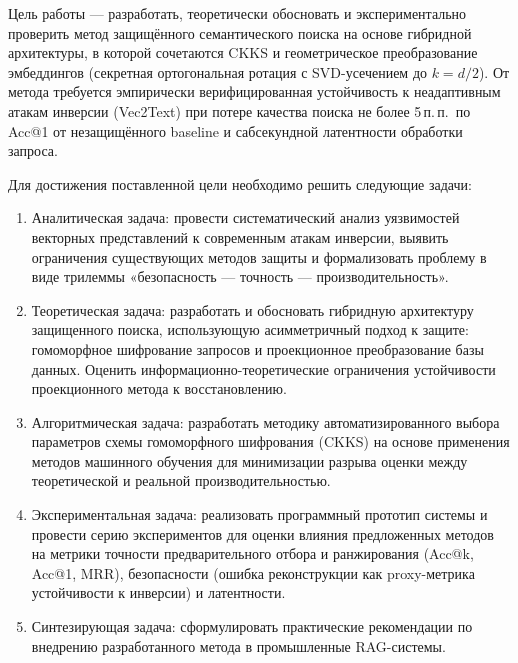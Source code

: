 \documentclass[a4paper, 12pt, oneside, openany]{article}
\begin{document}
Цель работы --- разработать, теоретически обосновать и экспериментально проверить метод защищённого семантического поиска на основе гибридной архитектуры, в которой сочетаются CKKS и геометрическое преобразование эмбеддингов (секретная ортогональная ротация с SVD-усечением до $k = d/2$). От метода требуется эмпирически верифицированная устойчивость к неадаптивным атакам инверсии (Vec2Text) при потере качества поиска не более 5\,п.\,п.\ по Acc@1 от незащищённого baseline и сабсекундной латентности обработки запроса.

Для достижения поставленной цели необходимо решить следующие задачи:
\begin{enumerate}
	\def\labelenumi{\arabic{enumi}.}
	\item
	Аналитическая задача: провести систематический анализ уязвимостей векторных представлений к современным атакам инверсии, выявить ограничения существующих методов защиты и формализовать проблему в виде трилеммы «безопасность --- точность --- производительность».
	\item
	Теоретическая задача: разработать и обосновать гибридную архитектуру защищенного поиска, использующую асимметричный подход к защите: гомоморфное шифрование запросов и проекционное преобразование базы данных. Оценить информационно-теоретические ограничения устойчивости проекционного метода к восстановлению.
	\item
	Алгоритмическая задача: разработать методику автоматизированного выбора параметров схемы гомоморфного шифрования (CKKS) на основе применения методов машинного обучения для минимизации разрыва оценки между теоретической и реальной производительностью.
	\item
	Экспериментальная задача: реализовать программный прототип системы и провести серию экспериментов для оценки влияния предложенных методов на метрики точности предварительного отбора и ранжирования (Acc@k, Acc@1, MRR), безопасности (ошибка реконструкции как proxy-метрика устойчивости к инверсии) и латентности.
	\item
	Синтезирующая задача: сформулировать практические рекомендации по внедрению разработанного метода в промышленные RAG-системы.
\end{enumerate}
\end{document}
